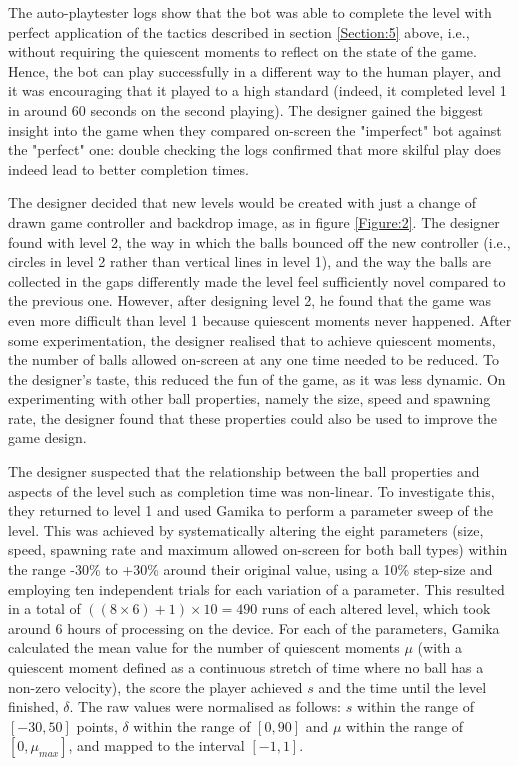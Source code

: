 \documentclass{IEEEtran}
\begin{document}
The auto-playtester logs show that the bot was able to complete the level with perfect application of the tactics described in section \ref{Section:5} above, i.e., without requiring the quiescent moments to reflect on the state of the game. Hence, the bot can play successfully in a different way to the human player, and it was encouraging that it played to a high standard (indeed, it completed level 1 in around 60 seconds on the second playing). The designer gained the biggest insight into the game when they compared on-screen the "imperfect" bot against the "perfect" one: double checking the logs confirmed that more skilful play does indeed lead to better completion times.

The designer decided that new levels would be created with just a change of drawn game controller and backdrop image, as in figure
\ref{Figure:2}. The designer found with level 2, the way in which the balls bounced off the new controller (i.e., circles in level 2 rather than vertical lines in level 1), and the way the balls are collected in the gaps differently made the level feel sufficiently novel compared to the previous one. However, after designing level 2, he found that the game was even more difficult than level 1 because quiescent moments never happened. After some experimentation, the designer realised that to achieve quiescent moments, the number of balls allowed on-screen at any one time needed to be reduced. To the designer's taste, this reduced the fun of the game, as it was less dynamic. On experimenting with other ball properties, namely the size, speed and spawning rate, the designer found that these properties could also be used to improve the game design.

The designer suspected that the relationship between the ball properties and aspects of the level such as completion time was non-linear. To investigate this, they returned to level 1 and used Gamika to perform a parameter sweep of the level. This was achieved by systematically altering the eight parameters (size, speed, spawning rate and maximum allowed on-screen for both ball types) within the range -30\% to +30\% around their original value, using a 10\% step-size and employing ten independent trials for each variation of a parameter. This resulted in a total of $((8 \times 6) +1) \times 10 = 490$ runs of each altered level, which took around 6 hours of processing on the device. For each of the parameters, Gamika calculated the mean value for the number of quiescent moments $\mu$ (with a quiescent moment defined as a continuous stretch of time where no ball has a non-zero velocity), the score the player achieved $s$ and the time until the level finished, $\delta$. The raw values were normalised as follows: $s$ within the range of $[-30,50]$ points, $\delta$ within the range of $[0,90]$ and $\mu$ within the range of $[0,\mu_{max}]$, and mapped to the interval $[-1, 1]$.
\end{document}

